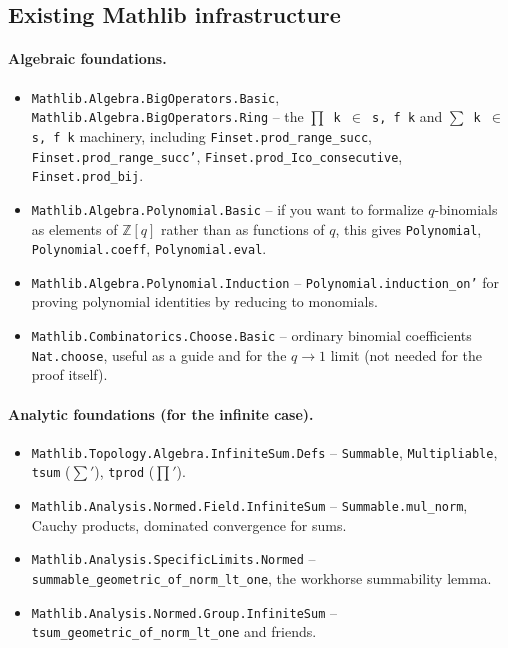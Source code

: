 \subsection{Existing Mathlib infrastructure}

\paragraph{Algebraic foundations.}
\begin{itemize}\item \texttt{Mathlib.Algebra.BigOperators.Basic}, \texttt{Mathlib.Algebra.BigOperators.Ring} -- the \texttt{$\prod$ k $\in$ s, f k} and \texttt{$\sum$ k $\in$ s, f k} machinery, including \texttt{Finset.prod\_range\_succ}, \texttt{Finset.prod\_range\_succ'}, \texttt{Finset.prod\_Ico\_consecutive}, \texttt{Finset.prod\_bij}.
\item \texttt{Mathlib.Algebra.Polynomial.Basic} -- if you want to formalize $q$-binomials as elements of $\mathbb{Z}[q]$ rather than as functions of $q$, this gives \texttt{Polynomial}, \texttt{Polynomial.coeff}, \texttt{Polynomial.eval}.
\item \texttt{Mathlib.Algebra.Polynomial.Induction} -- \texttt{Polynomial.induction\_on'} for proving polynomial identities by reducing to monomials.
\item \texttt{Mathlib.Combinatorics.Choose.Basic} -- ordinary binomial coefficients \texttt{Nat.choose}, useful as a guide and for the $q \to 1$ limit (not needed for the proof itself).
\end{itemize}

\paragraph{Analytic foundations (for the infinite case).}
\begin{itemize}\item \texttt{Mathlib.Topology.Algebra.InfiniteSum.Defs} -- \texttt{Summable}, \texttt{Multipliable}, \texttt{tsum} ($\sum'$), \texttt{tprod} ($\prod'$).
\item \texttt{Mathlib.Analysis.Normed.Field.InfiniteSum} -- \texttt{Summable.mul\_norm}, Cauchy products, dominated convergence for sums.
\item \texttt{Mathlib.Analysis.SpecificLimits.Normed} -- \texttt{summable\_geometric\_of\_norm\_lt\_one}, the workhorse summability lemma.
\item \texttt{Mathlib.Analysis.Normed.Group.InfiniteSum} -- \texttt{tsum\_geometric\_of\_norm\_lt\_one} and friends.
\end{itemize}

